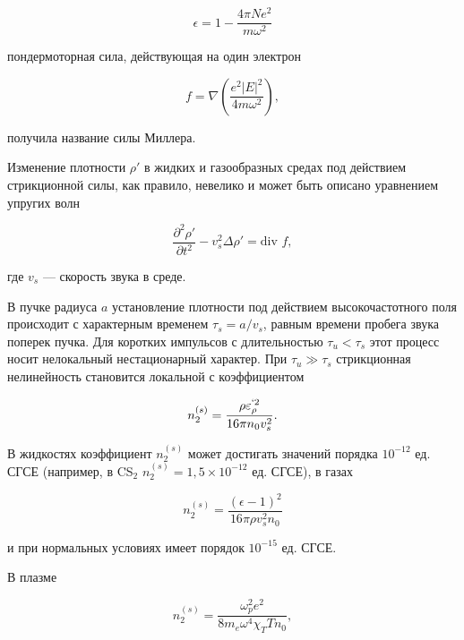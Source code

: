\documentclass[a4paper, 12pt]{article}
\begin{document}
\begin{equation}
\epsilon = 1 - \frac{4\pi Ne^2}{m \omega^2}
\label{eq:1.31}
\end{equation}

пондермоторная сила, действующая на один электрон

\begin{equation}
f = \nabla \left( \frac{e^2 |E|^2}{4m \omega^2} \right),
\label{eq:1.32}
\end{equation}

получила название силы Миллера.

Изменение плотности \(\rho'\) в жидких и газообразных средах под действием стрикционной силы, как правило, невелико и может быть описано уравнением упругих волн

\begin{equation}
\frac{\partial^2 \rho'}{\partial t^2} - v_s^2 \Delta \rho' = \text{div } f,
\label{eq:1.33}
\end{equation}

где \(v_s\) — скорость звука в среде.

В пучке радиуса \(a\) установление плотности под действием высокочастотного поля происходит с характерным временем \(\tau_s = a / v_s\), равным времени пробега звука поперек пучка. Для коротких импульсов с длительностью \(\tau_u < \tau_s\) этот процесс носит нелокальный нестационарный характер. При \(\tau_u \gg \tau_s\) стрикционная нелинейность становится локальной с коэффициентом

\begin{equation}
n_2^{(s)} = \frac{\rho \epsilon^{`2}_{\rho}}{16\pi n_0 v_s^2}.
\label{eq:1.35}
\end{equation}

В жидкостях коэффициент \(n_2^{(s)}\) может достигать значений порядка \(10^{-12}\) ед. СГСЕ (например, в CS\(_2\) \(n_2^{(s)} = 1,5 \times 10^{-12}\) ед. СГСЕ), в газах

\begin{equation}
n_2^{(s)} = \frac{(\epsilon-1)^2}{16\pi \rho v_s^2 n_0}
\label{eq:1.36}
\end{equation}

и при нормальных условиях имеет порядок \(10^{-15}\) ед. СГСЕ.

В плазме

\begin{equation}
n_2^{(s)} = \frac{\omega_p^2 e^2}{8m_e \omega^4 \chi_T T n_0},
\label{eq:1.37}
\end{equation}
\end{document}
